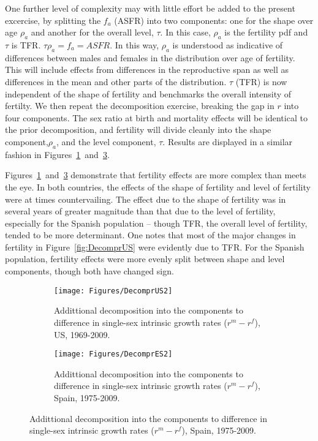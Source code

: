 One further level of complexity may with little effort be added to the present
excercise, by splitting the $f_a$ (ASFR) into two components: one for the shape
over age $\rho _a$ and another for the overall level, $\tau$. In this case, 
$\rho _a$ is the fertility pdf and $\tau$ is TFR. $\tau \rho _a = f_a = ASFR$.
In this way, $\rho _a$ is understood as indicative of differences
between males and females in the distribution over age of fertility. This will
include effects from differences in the reproductive span as well as differences
in the mean and other parts of the distribution. $\tau$ (TFR) is now independent
of the shape of fertility and benchmarks the overall intensity of fertilty. We
then repeat the decomposition exercise, breaking the gap in $r$ into four
components. The sex ratio at birth and mortality effects will be identical to
the prior decomposition, and fertility will divide cleanly into the shape
component,$\rho _a$, and the level component, $\tau$. Results are displayed in a
similar fashion in Figures~\ref{fig:DecomprUS2}~and~\ref{fig:DecomprES2}.

Figures~\ref{fig:DecomprUS2}~and~\ref{fig:DecomprES2} demonstrate that fertility
effects are more complex than meets the eye. In both countries, the effects of
the shape of fertility and level of fertility were at times countervailing. The 
effect due to the shape of fertility was in several years of greater magnitude 
than that due to the level of fertility, especially for the Spanish
population -- though TFR, the overall level of fertility, tended to be more
determinant. One notes that most of the major changes in fertility in
Figure~\ref{fig:DecomprUS} were evidently due to TFR. For the Spanish
population, fertility effects were more evenly split between shape and level components,
though both have changed sign.
\FloatBarrier
\begin{figure}[h!]
        \centering
        \begin{subfigure}
                \centering
                \caption{Addittional decomposition into the components to
                difference in single-sex intrinsic growth rates ($r^m - r^f$), US, 1969-2009.}
                \texttt{[image: Figures/DecomprUS2]}
                \label{fig:DecomprUS2}
        \end{subfigure}
        \begin{subfigure}
                \centering
                \caption{Addittional decomposition into the components to
                difference in single-sex intrinsic growth rates ($r^m - r^f$), Spain, 1975-2009.}
                \texttt{[image: Figures/DecomprES2]}  
                \label{fig:DecomprES2}
        \end{subfigure}
\end{figure}

